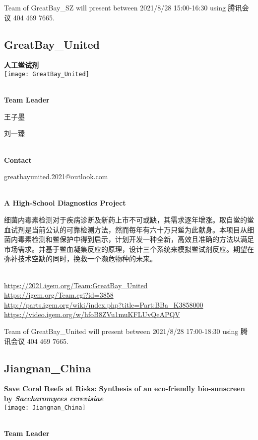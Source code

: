 Team of GreatBay\_SZ will present between       2021/8/28 15:00-16:30  using 腾讯会议 404 469 7665.
\newpage


\subsection{\textcolor{Blu}{ GreatBay\_United } }
\vspace{5mm}
\begin{center}
\large{
  \textbf{ 人工鲎试剂 }\\

  \texttt{[image: GreatBay\_United]}
}
\end{center}
\textbf{\\Team Leader}

  王子墨

  刘一臻


\textbf{\\Contact}

  greatbayunited.2021@outlook.com


\textbf{\\A High-School Diagnostics Project\\}\begin{spacing}{1.5}

细菌内毒素检测对于疾病诊断及新药上市不可或缺，其需求逐年增涨。取自鲎的鲎血试剂是当前公认的可靠检测方法，然而每年有六十万只鲎为此献身。本项目从细菌内毒素检测和鲎保护中得到启示，计划开发一种全新，高效且准确的方法以满足市场需求。并基于鲎血凝集反应的原理，设计三个系统来模拟鲎试剂反应。期望在弥补技术空缺的同时，挽救一个濒危物种的未来。\end{spacing}
\\

\url{https://2021.igem.org/Team:GreatBay\_United }\\
\url{https://igem.org/Team.cgi?id=3858 }\\
\url{http://parts.igem.org/wiki/index.php?title=Part:BBa_K3858000 }\\
\url{https://video.igem.org/w/hfoB8ZVu1muKFLUvQeAPQV }\\

\vfill{}









Team of GreatBay\_United will present between        2021/8/28 17:00-18:30 using 腾讯会议 404 469 7665.
\newpage


\subsection{\textcolor{Blu}{ Jiangnan\_China } }
\vspace{5mm}
\begin{center}
\large{
  \textbf{ Save Coral Reefs at Risks: Synthesis of an eco-friendly bio-sunscreen by \textit{Saccharomyces cerevisiae} }\\

  \texttt{[image: Jiangnan\_China]}
}
\end{center}
\textbf{\\Team Leader}

